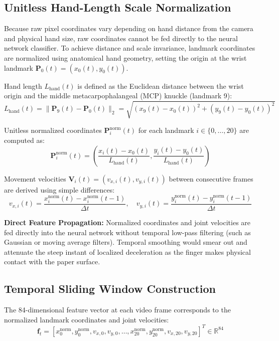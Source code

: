 \subsection{Unitless Hand-Length Scale Normalization}
\label{subsec:meth_scale_norm}
Because raw pixel coordinates vary depending on hand distance from the camera and physical hand size, raw coordinates cannot be fed directly to the neural network classifier. To achieve distance and scale invariance, landmark coordinates are normalized using anatomical hand geometry, setting the origin at the wrist landmark $\mathbf{P}_0(t) = (x_0(t), y_0(t))$.

Hand length $L_{\text{hand}}(t)$ is defined as the Euclidean distance between the wrist origin and the middle metacarpophalangeal (MCP) knuckle (landmark 9):
\begin{equation}
L_{\text{hand}}(t) = \|\mathbf{P}_9(t) - \mathbf{P}_0(t)\|_2 = \sqrt{(x_9(t) - x_0(t))^2 + (y_9(t) - y_0(t))^2}
\label{eq:meth_hand_length_def}
\end{equation}

Unitless normalized coordinates $\mathbf{P}_i^{\text{norm}}(t)$ for each landmark $i \in \{0, \dots, 20\}$ are computed as:
\begin{equation}
\mathbf{P}_i^{\text{norm}}(t) = \left( \frac{x_i(t) - x_0(t)}{L_{\text{hand}}(t)}, \frac{y_i(t) - y_0(t)}{L_{\text{hand}}(t)} \right)
\label{eq:meth_norm_coords_def}
\end{equation}

Movement velocities $\mathbf{V}_i(t) = (v_{x,i}(t), v_{y,i}(t))$ between consecutive frames are derived using simple differences:
\begin{equation}
v_{x,i}(t) = \frac{x_i^{\text{norm}}(t) - x_i^{\text{norm}}(t-1)}{\Delta t}, \quad
v_{y,i}(t) = \frac{y_i^{\text{norm}}(t) - y_i^{\text{norm}}(t-1)}{\Delta t}
\label{eq:meth_velocity_def}
\end{equation}

\textbf{Direct Feature Propagation:} Normalized coordinates and joint velocities are fed directly into the neural network without temporal low-pass filtering (such as Gaussian or moving average filters). Temporal smoothing would smear out and attenuate the steep instant of localized deceleration as the finger makes physical contact with the paper surface.

\subsection{Temporal Sliding Window Construction}
\label{subsec:meth_sliding_window}
The 84-dimensional feature vector at each video frame corresponds to the normalized landmark coordinates and joint velocities:
\begin{equation}
\mathbf{f}_t = \left[ x_0^{\text{norm}}, y_0^{\text{norm}}, v_{x,0}, v_{y,0}, \dots, x_{20}^{\text{norm}}, y_{20}^{\text{norm}}, v_{x,20}, v_{y,20} \right]^T \in \mathbb{R}^{84}
\label{eq:meth_feature_vector}
\end{equation}

